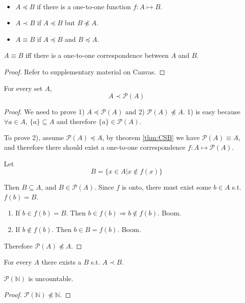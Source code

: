 \begin{definition}
    \label{def:SetDomination}
    ~{}
    \begin{itemize}
        \item $A \preceq B$ if there is a one-to-one function $f: A \mapsto B$.
        \item $ A \prec B$ if $A \preceq B$ but $B \npreceq A$.
        \item $A \equiv B$ if $A \preceq B$ and $B \preceq A$.
    \end{itemize}
\end{definition}

\begin{theorem}
    \label{thm:CSB}
    $A \equiv B$ iff there is a one-to-one correspondence between $A$ and $B$.
\end{theorem}
\begin{proof}
    Refer to supplementary material on Canvas.
\end{proof}

\begin{theorem}
    \label{thm:Cantor}
    For every set $A$,
    \[ A \prec \mathcal{P}(A) \]
\end{theorem}
\begin{proof}
    We need to prove 1) $A \preceq \mathcal{P}(A)$ and 2) $\mathcal{P}(A) \npreceq A$. 1) is easy because $\forall a \in A$, $\{a\} \subseteq A$ and therefore $\{a\} \in \mathcal{P}(A)$.

    To prove 2), assume $\mathcal{P}(A) \preceq A$, by theorem \ref{thm:CSB} we have $\mathcal{P}(A) \equiv A$, and therefore there should exist a one-to-one correspondence $f: A \mapsto \mathcal{P}(A)$.

    Let
    \[ B = \{x \in A|x \notin f(x)\} \]

    Then $B \subseteq A$, and $B \in \mathcal{P}(A)$. Since $f$ is onto, there must exist some $b \in A$ s.t. $f(b) = B$.

    \begin{enumerate}
        \item If $b \in f(b) = B$. Then $b \in f(b) \Rightarrow b \notin f(b)$. Boom.
        \item If $b \notin f(b)$. Then $b \in B = f(b)$. Boom.
    \end{enumerate}

    Therefore $\mathcal{P}(A) \npreceq A$.
\end{proof}
\begin{corollary}
    For every $A$ there exists a $B$ s.t. $A \prec B$.
\end{corollary}
\begin{corollary}
    $\mathcal{P}(\mathbb{N})$ is uncountable.
\end{corollary}
\begin{proof}
    $\mathcal{P}(\mathbb{N}) \npreceq \mathbb{N}$.
\end{proof}

